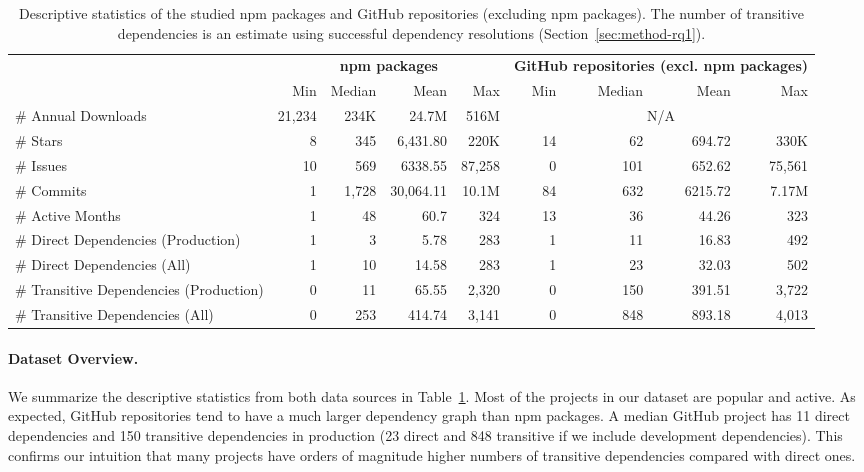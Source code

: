 \begin{table}[t]
    \scriptsize
    \centering
    \caption{Descriptive statistics of the studied npm packages and GitHub repositories (excluding npm packages). The number of transitive dependencies is an estimate using successful dependency resolutions (Section~\ref{sec:method-rq1}).}
    \begin{tabular}{lrrrrrrrr}
      \toprule
         & \multicolumn{4}{c}{\textbf{npm packages}} & \multicolumn{4}{c}{\textbf{GitHub repositories (excl. npm packages)}} \\
         & Min & Median & Mean & Max & Min & Median & Mean & Max\\
      \midrule
       \# Annual Downloads    & 21,234  & 234K & 24.7M & 516M & \multicolumn{4}{c}{N/A}\\ 
       \# Stars         & 8 & 345 & 6,431.80 &  220K & 14 & 62 & 694.72 & 330K\\
       \# Issues        & 10 & 569 & 6338.55  & 87,258 & 0 & 101 & 652.62 & 75,561\\
       \# Commits       & 1 & 1,728 & 30,064.11 & 10.1M & 84 & 632 & 6215.72 & 7.17M\\
       \# Active Months & 1 & 48 & 60.7 & 324 & 13 & 36 & 44.26 & 323\\ 
       \# Direct Dependencies (Production)  & 1 & 3 & 5.78 & 283 & 1 & 11 & 16.83 & 492 \\
       \# Direct Dependencies (All) & 1 & 10 & 14.58 & 283 & 1 & 23 & 32.03 & 502 \\
       \# Transitive Dependencies (Production) & 0 & 11 & 65.55 & 2,320 & 0 & 150 & 391.51 & 3,722\\
       \# Transitive Dependencies (All) & 0 & 253 & 414.74 & 3,141 & 0 & 848 & 893.18 & 4,013\\
      \bottomrule
    \end{tabular}
    \label{tab:dataset}
\end{table}

\paragraph{Dataset Overview.}
We summarize the descriptive statistics from both data sources in Table~\ref{tab:dataset}.
Most of the projects in our dataset are popular and active.
As expected, GitHub repositories tend to have a much larger dependency graph than npm packages.
A median GitHub project has 11 direct dependencies and 150 transitive dependencies in production (23 direct and 848 transitive if we include development dependencies).
This confirms our intuition that many projects have orders of magnitude higher numbers of transitive dependencies compared with direct ones. 


